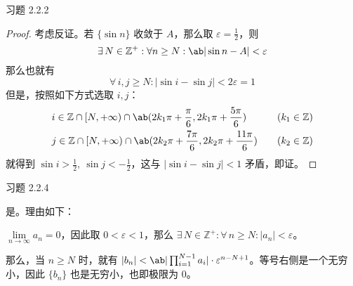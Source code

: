 \begin{problem}
	习题 2.2.2
	\begin{proof}
		考虑反证。若 $\{\sin n\}$ 收敛于 $A$，那么取 $\varepsilon = \frac{1}{2}$，则
		$$
		\exists\,N \in \mathbb{Z}^+: \forall n \ge N: \ab|\sin n - A| < \varepsilon
		$$
		那么也就有
		$$
		\forall\,i,j \ge N: |\sin i - \sin j| < 2\varepsilon = 1
		$$
		但是，按照如下方式选取 $i,j$：
		$$
		\begin{aligned}
			& i \in \mathbb{Z} \cap [N,+\infty) \cap \ab(2k_1\pi + \frac{\pi}{6}, 2k_1\pi + \frac{5\pi}{6}) & \quad (k_1 \in \mathbb{Z})\\
			& j \in \mathbb{Z} \cap [N,+\infty) \cap \ab(2k_2\pi + \frac{7\pi}{6}, 2k_2\pi + \frac{11\pi}{6}) & \quad (k_2 \in \mathbb{Z})
		\end{aligned}
		$$
		就得到 $\sin i > \frac{1}{2},\ \sin j < -\frac{1}{2}$，这与 $|\sin i - \sin j| < 1$ 矛盾，即证。
	\end{proof}
\end{problem}

\begin{problem}
	习题 2.2.4
	\begin{solution}
		是。理由如下：

		$\lim\limits_{n \to \infty} a_n = 0$，因此取 $0 < \varepsilon < 1$，那么 $\exists\,N \in \mathbb{Z}^+: \forall\,n \geq N: |a_n| < \varepsilon$。

		那么，当 $n \geq N$ 时，就有 $|b_n| < \ab|\prod_{i=1}^{N-1} a_i| \cdot \varepsilon^{n - N + 1}$。等号右侧是一个无穷小，因此 $\{b_n\}$ 也是无穷小，也即极限为 $0$。 
	\end{solution}
\end{problem}

